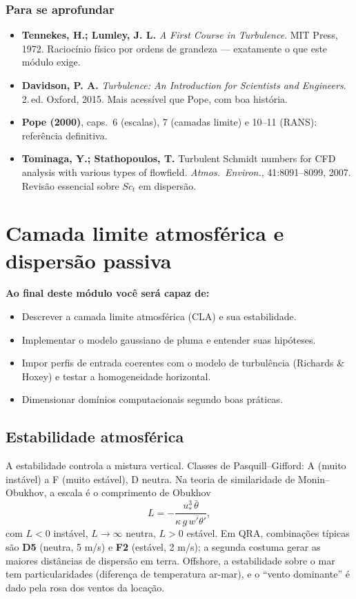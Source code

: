 \documentclass[10pt,a4paper,twocolumn,openany]{report}
\newenvironment{conceito}[1]{\section{#1}}{\par}
\newenvironment{aprofundar}{\subsection*{\textcolor{amarelo}{Para se aprofundar}}\small}{\par}
\newcommand{\objetivos}{\noindent\textbf{Ao final deste módulo você será capaz de:}}
\begin{document}
\begin{aprofundar}
\begin{itemize}[leftmargin=*]
  \item \textbf{Tennekes, H.; Lumley, J. L.} \emph{A First Course in Turbulence}. MIT Press, 1972. Raciocínio físico por ordens de grandeza --- exatamente o que este módulo exige.
  \item \textbf{Davidson, P. A.} \emph{Turbulence: An Introduction for Scientists and Engineers}. 2.\,ed. Oxford, 2015. Mais acessível que Pope, com boa história.
  \item \textbf{Pope (2000)}, caps.\ 6 (escalas), 7 (camadas limite) e 10--11 (RANS): referência definitiva.
  \item \textbf{Tominaga, Y.; Stathopoulos, T.} Turbulent Schmidt numbers for CFD analysis with various types of flowfield. \emph{Atmos.\ Environ.}, 41:8091--8099, 2007. Revisão essencial sobre $Sc_t$ em dispersão.
\end{itemize}
\end{aprofundar}

\chapter{Camada limite atmosférica e dispersão passiva}

\objetivos
\begin{itemize}
  \item Descrever a camada limite atmosférica (CLA) e sua estabilidade.
  \item Implementar o modelo gaussiano de pluma e entender suas hipóteses.
  \item Impor perfis de entrada coerentes com o modelo de turbulência
        (Richards \& Hoxey) e testar a homogeneidade horizontal.
  \item Dimensionar domínios computacionais segundo boas práticas.
\end{itemize}

\begin{conceito}{Estabilidade atmosférica}
A estabilidade controla a mistura vertical. Classes de Pasquill--Gifford:
A (muito instável) a F (muito estável), D neutra. Na teoria de similaridade
de Monin--Obukhov, a escala é o comprimento de Obukhov
\[
  L = -\frac{u_*^3\,\bar\theta}{\kappa\,g\,\overline{w'\theta'}} ,
\]
com $L<0$ instável, $L\rightarrow\infty$ neutra, $L>0$ estável. Em QRA,
combinações típicas são \textbf{D5} (neutra, 5 m/s) e \textbf{F2} (estável,
2 m/s); a segunda costuma gerar as maiores distâncias de dispersão em
terra. Offshore, a estabilidade sobre o mar tem particularidades (diferença
de temperatura ar-mar), e o ``vento dominante'' é dado pela rosa dos ventos
da locação.
\end{conceito}
\end{document}
